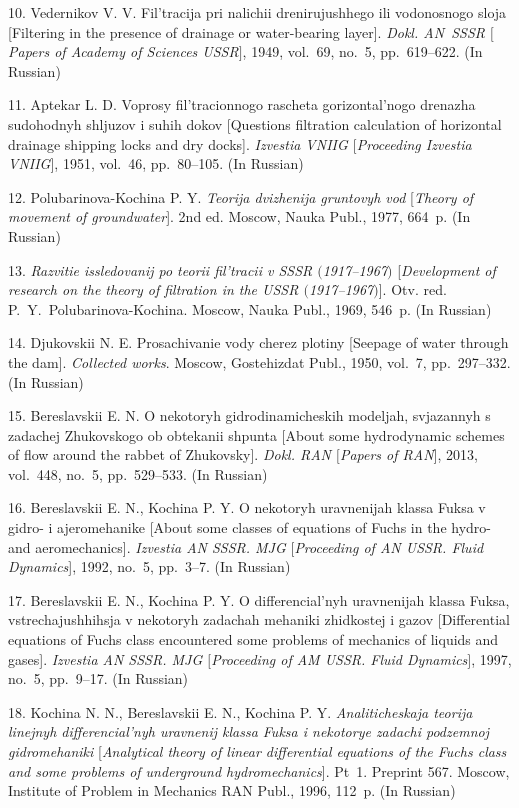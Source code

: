 {10. Vedernikov V. V. Fil'tracija pri nalichii drenirujushhego ili
vodonosnogo sloja [Filtering in the presence of drainage or
water-bearing layer]. \textit{Dokl. AN~SSSR $[$Papers of Academy
of Sciences USSR$]$}, 1949, vol.~69, no.~5, pp.~619--622. (In
Russian)

11. Aptekar L. D. Voprosy fil'tracionnogo rascheta gorizontal'nogo
drenazha sudohodnyh shljuzov i suhih dokov [Questions filtration
calculation of horizontal drainage shipping locks and dry docks].
\textit{Izvestia VNIIG $[$Proceeding Izvestia VNIIG$]$}, 1951,
vol.~46, pp.~80--105. (In Russian)

12. Polubarinova-Kochina P. Y. \textit{Teorija dvizhenija
gruntovyh vod} [\textit{Theory of movement of groundwater}]. 2nd
ed. Moscow, Nauka Publ., 1977, 664~p. (In Russian)

13. \textit{Razvitie issledovanij po teorii fil'tracii v SSSR
$($1917--1967$)$} [\textit{Development of research on the theory
of filtration in the USSR $($1917--1967$)$}]. Otv. red.
P.~Y.~Po\-lu\-ba\-ri\-no\-va-Ko\-chi\-na. Moscow, Nauka Publ.,
1969, 546~p. (In Russian)

14. Djukovskii N. E. Prosachivanie vody cherez plotiny [Seepage of
water through the dam]. \textit{Collected works}. Moscow,
Gostehizdat Publ., 1950, vol.~7, pp.~297--332. (In Russian)

15. Bereslavskii E. N. O nekotoryh gidrodinamicheskih modeljah,
svjazannyh s zadachej Zhukovskogo ob obtekanii shpunta [About some
hydrodynamic schemes of flow around the rabbet of Zhukovsky].
\textit{Dokl. RAN $[$Papers of RAN$]$}, 2013, vol.~448, no.~5,
pp.~529--533. (In Russian)

16. Bereslavskii E. N., Kochina P. Y. O nekotoryh uravnenijah
klassa Fuksa v gidro- i ajeromehanike [About some classes of
equations of Fuchs in the hydro- and aeromechanics].
\textit{Izvestia AN SSSR. MJG} [\textit{Proceeding of AN USSR.
Fluid Dynamics}], 1992, no.~5, pp.~3--7. (In Russian)

17. Bereslavskii E. N., Kochina P. Y. O differencial'nyh
uravnenijah klassa Fuksa, vstrechajushhihsja v nekotoryh zadachah
mehaniki zhidkostej i gazov [Differential equations of Fuchs class
encountered some problems of mechanics of liquids and gases].
\textit{Izvestia AN SSSR. MJG $[$Proceeding of AM USSR. Fluid
Dynamics$]$}, 1997, no.~5, pp.~9--17. (In Russian)

18. Kochina N. N., Bereslavskii E. N., Kochina P. Y.
\textit{Analiticheskaja teorija linejnyh differencial'nyh
uravnenij klassa Fuksa i nekotorye zadachi podzemnoj
gidromehaniki} [{\it Analytical theory of linear differential
equations of the Fuchs class and some problems of underground
hydromechanics}]. Pt~1. Preprint 567. Moscow, Institute of Problem
in Mechanics RAN Publ., 1996, 112~p. (In Russian)

}
